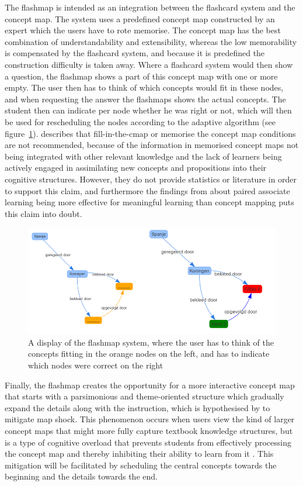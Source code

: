 The flashmap is intended as an integration between the flashcard system and the concept map. The system uses a predefined concept map constructed by an expert which the users have to rote memorise. The concept map has the best combination of understandability and extensibility, whereas the low memorability is compensated by the flashcard system, and because it is predefined the construction difficulty is taken away. Where a flashcard system would then show a question, the flashmap shows a part of this concept map with one or more empty. The user then has to think of which concepts would fit in these nodes, and when requesting the answer the flashmaps shows the actual concepts. The student then can indicate per node whether he was right or not, which will then be used for rescheduling the nodes according to the adaptive algorithm (see figure~\ref{fig:flashmap}).  describes that fill-in-the-cmap or memorise the concept map conditions are not recommended, because of the information in memorised concept maps not being integrated with other relevant knowledge and the lack of learners being actively engaged in assimilating new concepts and propositions into their cognitive structures. However, they do not provide statistics or literature in order to support this claim, and furthermore the findings from  about paired associate learning being more effective for meaningful learning than concept mapping puts this claim into doubt.

\begin{figure}
    \centering
    \includegraphics[width=\textwidth]{img/flashmap}
    \caption{A display of the flashmap system, where the user has to think of the concepts fitting in the orange nodes on the left, and has to indicate which nodes were correct on the right}
    \label{fig:flashmap}
\end{figure}

Finally, the flashmap creates the opportunity for a more interactive concept map that starts with a parsimonious and theme-oriented structure which gradually expand the details along with the instruction, which is hypothesised by  to mitigate map shock. This phenomenon occurs when users view the kind of larger concept maps that might more fully capture textbook knowledge structures, but is a type of cognitive overload that prevents students from effectively processing the concept map and thereby inhibiting their ability to learn from it \cite{moore}. This mitigation will be facilitated by scheduling the central concepts towards the beginning and the details towards the end.

